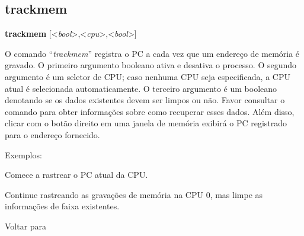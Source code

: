 \documentclass[letterpaper,10pt,brazil]{sphinxmanual}
\begin{document}
\subsection{trackmem}
\label{debugger/general:debugger-command-trackmem}\label{debugger/general:trackmem}
\begin{DUlineblock}{0em}
\item[]
\begin{DUlineblock}{\DUlineblockindent}
\item[] \textbf{trackmem} {[}\textless{}\emph{bool}\textgreater{},\textless{}\emph{cpu}\textgreater{},\textless{}\emph{bool}\textgreater{}{]}
\item[] 
\end{DUlineblock}
\item[] O comando ``\emph{trackmem}'' registra o PC a cada vez que um endereço de memória é gravado. O primeiro argumento booleano ativa e desativa o processo. O segundo argumento é um seletor de CPU; caso nenhuma CPU seja especificada, a CPU atual é selecionada automaticamente. O terceiro argumento é um booleano denotando se os dados existentes devem ser limpos ou não. Favor consultar o comando {\hyperref[debugger/general:debugger\string-command\string-pcatmem]{}} para obter informações sobre como recuperar esses dados. Além disso, clicar com o botão direito em uma janela de memória exibirá o PC registrado para o endereço fornecido.
\item[] 
\item[] Exemplos:
\item[] 
\item[]
\begin{DUlineblock}{\DUlineblockindent}
\item[] 
\item[] 
\end{DUlineblock}
\item[] Comece a rastrear o PC atual da CPU.
\item[] 
\item[]
\begin{DUlineblock}{\DUlineblockindent}
\item[] 
\item[] 
\end{DUlineblock}
\item[] Continue rastreando as gravações de memória na CPU 0, mas limpe as informações de faixa existentes.
\item[] 
\item[] Voltar para {\hyperref[debugger/general:debugger\string-general\string-list]{}}
\end{DUlineblock}
\begin{quote}
\label{debugger/general:debugger-command-pcatmem}\end{quote}
\end{document}
